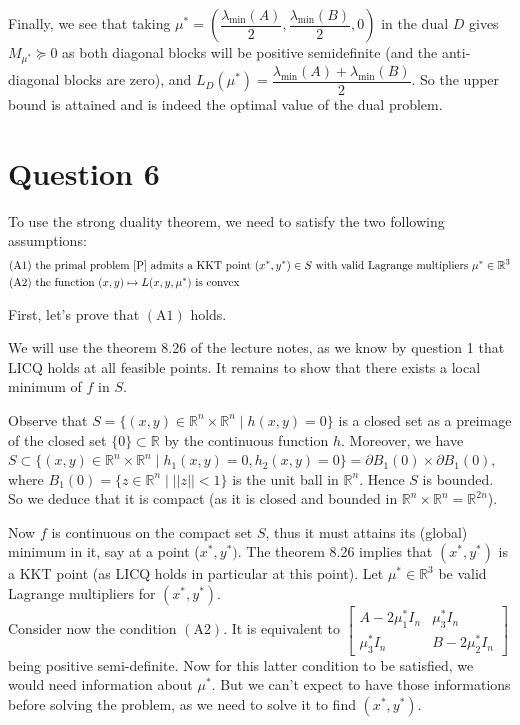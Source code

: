 \documentclass{article}
\newcommand{\R}{\mathbb{R}}
\begin{document}
Finally, we see that taking $\mu^*=\left(\dfrac{\lambda_{\min} (A)}{2}, \dfrac{\lambda_{\min} (B)}{2}, 0\right)$ in the dual $D$ gives $M_{\mu^*}\succeq 0$ as both diagonal blocks will be positive semidefinite (and the anti-diagonal blocks are zero), and $L_D(\mu^*)=\dfrac{\lambda_{\min} (A)+\lambda_{\min} (B)}{2}$. So the upper bound is attained and is indeed the optimal value of the dual problem.


\section*{Question 6}
To use the strong duality theorem, we need to satisfy the two following assumptions:
\begin{align*}
(\text{A}1) &  \text{ the primal problem \eqref{P} admits a KKT point } (x^*,y^*)\in S \text{ with valid Lagrange multipliers } \mu^*\in \R^3 \\
(\text{A}2) &  \text{ the function } (x,y)\mapsto L(x,y,\mu^*) \text{ is convex}
\end{align*}

\noindent First, let's prove that $(\text{A}1)$ holds.

We will use the theorem 8.26 of the lecture notes, as we know by question 1 that LICQ holds at all feasible points. It remains to show that there exists a local minimum of $f$ in $S$.
 
Observe that $S=\{(x,y)\in\R^n\times\R^n \mid h(x,y)=0\}$ is a closed set as a preimage of the closed set $\{0\}\subset \R$ by the continuous function $h$. Moreover, we have $S\subset \{(x, y)\in\R^n\times\R^n \mid h_1(x,y)=0, h_2(x,y)=0\} = \partial B_1(0)\times \partial B_1(0)$, where $B_1(0)=\{z\in\R^n\mid ||z||<1\}$ is the unit ball in $\R^n$. Hence $S$ is bounded. So we deduce that it is compact (as it is closed and bounded in $\R^n\times\R^n=\R^{2n}$).
 
 Now $f$ is continuous on the compact set $S$, thus it must attains its (global) minimum in it, say at a point ($x^*,y^*)$. The theorem 8.26 implies that $(x^*,y^*)$ is a KKT point (as LICQ holds in particular at this point).
 Let $\mu^*\in\R^3$ be valid Lagrange multipliers for $(x^*,y^*)$.\\
 
\noindent Consider now the condition $(\text{A}2)$. It is equivalent to $\begin{bmatrix} A-2\mu^*_1 I_n & \mu^*_3 I_n \\
\mu^*_3 I_n & B-2\mu^*_2 I_n \end{bmatrix}$ being positive semi-definite. Now for this latter condition to be satisfied, we would need information about $\mu^*$. But we can't expect to have those informations before solving the problem, as we need to solve it to find $(x^*,y^*)$.
 
\end{document}
